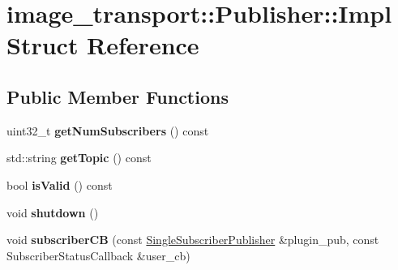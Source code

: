 \hypertarget{structimage__transport_1_1_publisher_1_1_impl}{\section{image\-\_\-transport\-:\-:Publisher\-:\-:Impl Struct Reference}
\label{structimage__transport_1_1_publisher_1_1_impl}
}
\subsection*{Public Member Functions}
\begin{DoxyCompactItemize}
\item 
\hypertarget{structimage__transport_1_1_publisher_1_1_impl_ae5fa527c01befd32534c2acedc7d7d06}{uint32\-\_\-t {\bfseries get\-Num\-Subscribers} () const }\label{structimage__transport_1_1_publisher_1_1_impl_ae5fa527c01befd32534c2acedc7d7d06}

\item 
\hypertarget{structimage__transport_1_1_publisher_1_1_impl_a194f5bf18612e0808af6dc76bac7312a}{std\-::string {\bfseries get\-Topic} () const }\label{structimage__transport_1_1_publisher_1_1_impl_a194f5bf18612e0808af6dc76bac7312a}

\item 
\hypertarget{structimage__transport_1_1_publisher_1_1_impl_afdeac6f693e980a669722f56f9c263bb}{bool {\bfseries is\-Valid} () const }\label{structimage__transport_1_1_publisher_1_1_impl_afdeac6f693e980a669722f56f9c263bb}

\item 
\hypertarget{structimage__transport_1_1_publisher_1_1_impl_a05762aaca515a039017521dd04763cb6}{void {\bfseries shutdown} ()}\label{structimage__transport_1_1_publisher_1_1_impl_a05762aaca515a039017521dd04763cb6}

\item 
\hypertarget{structimage__transport_1_1_publisher_1_1_impl_ac32219a7ba5581cf9d8d3cf8dde5a48c}{void {\bfseries subscriber\-C\-B} (const \hyperlink{classimage__transport_1_1_single_subscriber_publisher}{Single\-Subscriber\-Publisher} \&plugin\-\_\-pub, const Subscriber\-Status\-Callback \&user\-\_\-cb)}\label{structimage__transport_1_1_publisher_1_1_impl_ac32219a7ba5581cf9d8d3cf8dde5a48c}

\end{DoxyCompactItemize}
